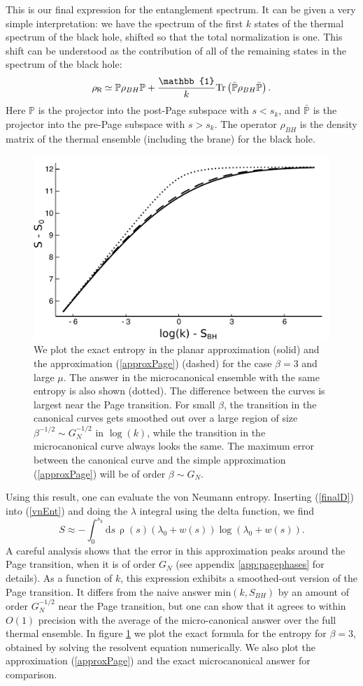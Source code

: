 \documentclass[12pt]{article}
\newcommand{\be}{\begin{equation}}
\newcommand{\ee}{\end{equation}}
\numberwithin{equation}{section}
\def\tr{\text{Tr}}
\begin{document}
This is our final expression for the entanglement spectrum. It can be given a very simple interpretation: we have the spectrum of the first $k$ states of the thermal spectrum of the black hole, shifted so that the total normalization is one. This shift can be understood as the contribution of all of the remaining states in the spectrum of the black hole:
\be
\rho_{\sf{R}}\simeq \mathbb{P} \rho_{BH} \mathbb{P}+{\mathbb{1}\over k}\tr\left(\mathbb{ \bar P} \rho_{BH}\mathbb{\bar P }\right).
\ee
Here $\mathbb{P}$ is the projector into the post-Page subspace with $s < s_k$, and $\mathbb{\bar P}$ is the projector into the pre-Page subspace with $s > s_k$. The operator $\rho_{BH}$ is the density matrix of the thermal ensemble (including the brane) for the black hole.

\begin{figure}[t]
\begin{center}
\includegraphics[width = .45\textwidth]{images/pagecurve2.pdf}
\caption{{\small We plot the exact entropy in the planar approximation (solid) and the approximation (\ref{approxPage}) (dashed) for the case $\beta = 3$ and large $\mu$. The answer in the microcanonical ensemble with the same entropy is also shown (dotted). The difference between the curves is largest near the Page transition. For small $\beta$, the transition in the canonical curves gets smoothed out over a large region of size $\beta^{-1/2} \sim G_N^{-1/2}$ in $\log(k)$, while the transition in the microcanonical curve always looks the same. The maximum error between the canonical curve and the simple approximation (\ref{approxPage}) will be of order $\beta \sim G_N$.}}\label{fig:entropy}
\end{center}
\end{figure}
Using this result, one can evaluate the von Neumann entropy. Inserting (\ref{finalD}) into (\ref{vnEnt}) and doing the $\lambda$ integral using the delta function, we find
\be
	S\approx -\int_0^{s_k}\mathrm{d}s\,\uprho(s)(\lambda_0+w(s))\log(\lambda_0+w(s)).\label{approxPage}
\ee
A careful analysis shows that the error in this approximation peaks around the Page transition, when it is of order $G_N$ (see appendix \ref{app:pagephases} for details). As a function of $k$, this expression exhibits a smoothed-out version of the Page transition. It differs from the naive answer $\text{min}(k,S_{BH})$ by an amount of order $G_N^{-1/2}$ near the Page transition, but one can show that it agrees to within $O(1)$ precision with the average of the micro-canonical answer over the full thermal ensemble. In figure \ref{fig:entropy} we plot the exact formula for the entropy for $\beta = 3$, obtained by solving the resolvent equation numerically. We also plot the approximation (\ref{approxPage}) and the exact microcanonical answer for comparison.
\end{document}

